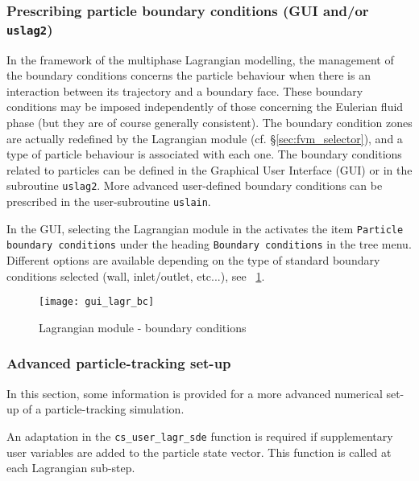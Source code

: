 {{{%
\subsubsection{Prescribing particle boundary conditions (GUI and/or \texttt{uslag2})}
In the framework of the multiphase Lagrangian modelling, the management of the boundary conditions concerns the particle behaviour when there is an interaction between its trajectory and a boundary face. These boundary conditions may be imposed independently of those concerning the Eulerian fluid phase (but they are of course generally consistent). The boundary condition zones are actually redefined by the Lagrangian module (cf. \S\ref{sec:fvm_selector}), and a type of particle behaviour is associated with each one. The boundary conditions related to particles can be defined in the Graphical User Interface (GUI) or in the subroutine \texttt{uslag2}. More advanced user-defined boundary conditions can be prescribed in the user-subroutine \texttt{uslain}.


 In the GUI, selecting the Lagrangian module in the activates the item \texttt{Particle boundary conditions} under the heading \texttt{Boundary conditions} in the tree menu. Different options are available depending on the type of standard boundary conditions selected (wall, inlet/outlet, etc...),
 see \figurename~\ref{fig:CL-Lag}.

\begin{figure}[ht]
\begin{center}
\texttt{[image: gui\_lagr\_bc]}
\caption{Lagrangian module - boundary conditions}
\label{fig:CL-Lag}
\end{center}
\end{figure}

\subsubsection{Advanced particle-tracking set-up}

In this section, some information is provided for a more advanced numerical set-up of a particle-tracking simulation.


\noindent
An adaptation in the \texttt{cs\_user\_lagr\_sde} function is required if
supplementary user variables are added to the particle state vector.
This function is called at each Lagrangian sub-step.

}}}
